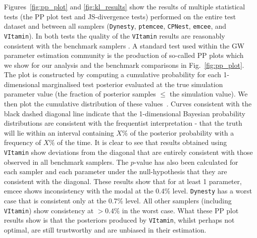 %
%
Figures~\ref{fig:pp_plot} and \ref{fig:kl_results}
show the results of multiple statistical 
tests (the \ac{PP} plot test and \ac{JS}-divergence tests) 
performed on the entire test dataset and between all samplers 
(\texttt{Dynesty}, \texttt{ptemcee}, \texttt{CPNest}, \texttt{emcee}, 
and \texttt{VItamin}). In
both tests the quality of the \texttt{VItamin} results are
 reasonably consistent with the
benchmark samplers
. 
A standard test used within the \ac{GW} parameter estimation community 
is the production of so-called \ac{PP} plots which we show for our 
analysis and the benchmark comparisons in Fig.~\ref{fig:pp_plot}. The plot 
is constructed by computing a cumulative probability for each 
1-dimensional marginalised test posterior evaluated at the true simulation parameter value (the fraction of posterior samples $\leq$ the simulation value). We then plot the cumulative distribution of these values~\cite{1409.7215}. Curves consistent with the black dashed diagonal line indicate that the 1-dimensional Bayesian probability distributions are consistent with the frequentist interpretation - that the truth will lie within an interval containing $X\%$ of the posterior probability with a frequency of $X\%$ of the time. It is clear to see that results obtained using \texttt{VItamin} show deviations from the diagonal that are entirely consistent with those observed in all benchmark samplers. The $p$-value has also been calculated for each sampler and each parameter under the null-hypothesis that they are consistent with the diagonal. These results show that for at least 1 parameter, emcee shows inconsistency with the modal at the 0.4\% level. \texttt{Dynesty} has a worst case that is consistent only at the 0.7\% level.  All other samplers (including \texttt{VItamin}) show consistency at $>0.4\%$ in the worst case.
What these \ac{PP} plot results show is that the posteriors produced 
by \texttt{VItamin}, whilst perhaps not optimal, are still trustworthy and are unbiased 
in their estimation.~
~ 
~


